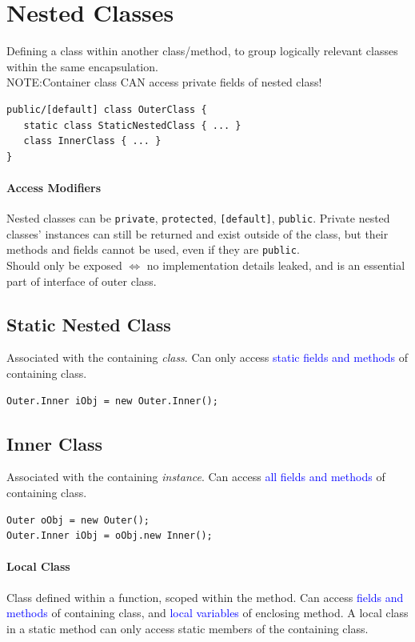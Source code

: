 \section{Nested Classes}
Defining a class within another class/method, to group logically relevant
classes within the same encapsulation.\\
\textcolor{Bittersweet}{NOTE:\@ Container class CAN access private fields of
nested class!}
\begin{verbatim}
public/[default] class OuterClass {
   static class StaticNestedClass { ... }
   class InnerClass { ... }
}
\end{verbatim}
\paragraph{Access Modifiers}
Nested classes can be \verb$private$, \verb$protected$, \verb$[default]$,
\verb$public$. Private nested classes' instances can still be returned and
exist outside of the class, but their methods and fields cannot be used, even
if they are \verb$public$.\\
Should only be exposed $\iff$ no implementation details leaked, and is an essential part of
interface of outer class.
\subsection{Static Nested Class}
Associated with the containing \emph{class}. Can only access \textcolor{Blue}{static
fields and methods} of containing class.
\begin{verbatim}
Outer.Inner iObj = new Outer.Inner();
\end{verbatim}
\subsection{Inner Class}
Associated with the containing \emph{instance}. Can access \textcolor{Blue}{all
fields and methods} of containing class.
\begin{verbatim}
Outer oObj = new Outer();
Outer.Inner iObj = oObj.new Inner();
\end{verbatim}
\paragraph{Local Class}
Class defined within a function, scoped within the method. Can access
\textcolor{Blue}{fields and methods} of containing class, and
\textcolor{Blue}{local variables} of enclosing method. A local class in a
static method can only access static members of the containing class.
